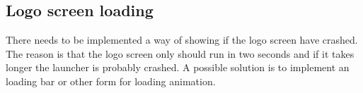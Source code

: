 \subsection{Logo screen loading}
\label{backlog:logo_screen_loading}

There needs to be implemented a way of showing if the logo screen have crashed. The reason is that the logo screen only should run in two seconds and if it takes longer the launcher is probably crashed. 
A possible solution is to implement an loading bar or other form for loading animation.